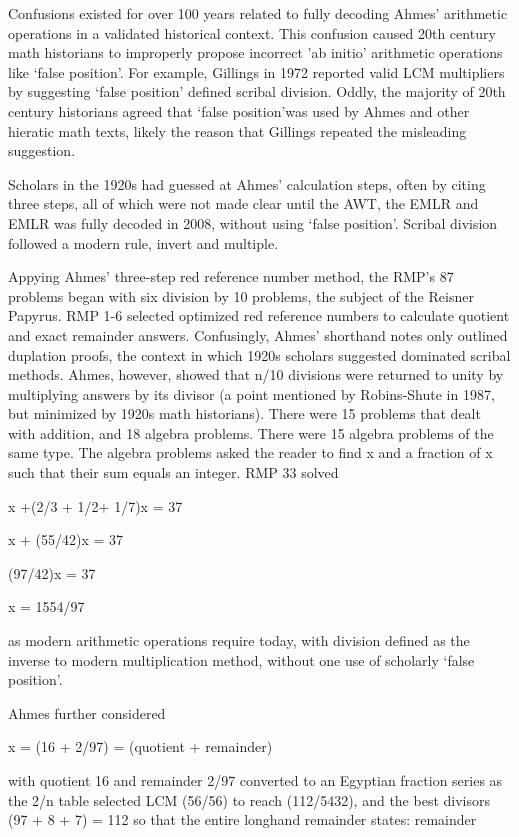 \documentclass[12pt]{article}
\begin{document}
Confusions existed for over 100 years related to fully decoding Ahmes’ arithmetic operations in a validated historical context. This confusion caused 20th century math historians to improperly propose incorrect ’ab initio’ arithmetic operations like ‘false position’. For example, Gillings in 1972 reported valid LCM multipliers by suggesting ‘false position’ defined scribal division.  Oddly, the majority of 20th century historians agreed that ‘false position’was used by Ahmes and other hieratic math texts, likely the reason that Gillings repeated the misleading suggestion. 

Scholars in the 1920s had guessed at Ahmes’ calculation steps, often by citing three steps,  all of which were not made clear until the AWT, the EMLR and EMLR was fully decoded in 2008, without using ‘false position’. Scribal division followed a modern rule, invert and multiple.

Appying Ahmes’ three-step red reference number method, the RMP’s 87 problems began with six division by 10 problems, the subject of the Reisner Papyrus. RMP 1-6 selected optimized red reference numbers to calculate quotient and exact remainder answers. Confusingly, Ahmes’ shorthand notes only outlined duplation proofs, the context in which 1920s scholars suggested dominated scribal methods. Ahmes, however, showed that n/10 divisions were returned to unity by multiplying answers by its divisor (a point mentioned by Robins-Shute in 1987, but minimized by 1920s math historians). There were 15 problems that dealt with addition, and 18 algebra problems. There were 15 algebra problems of the same type. The algebra problems asked the reader to find x and a fraction of x such that their sum equals an integer.
RMP 33 solved

x +(2/3 + 1/2+ 1/7)x = 37

x + (55/42)x = 37

(97/42)x = 37

x = 1554/97

as modern arithmetic operations require today, with division defined as the inverse to modern multiplication method, without one use of scholarly ‘false position’.

Ahmes further considered

x = (16 + 2/97) = (quotient + remainder)

with quotient 16 and remainder 2/97 converted to an Egyptian fraction series as the 2/n table selected LCM (56/56) to reach (112/5432), and the best divisors  (97 + 8 + 7) = 112 so that the entire longhand remainder states:
remainder 
\end{document}
